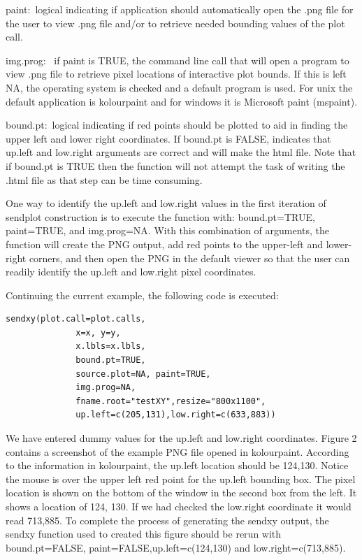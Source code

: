 \documentclass[]{article}
\begin{document}
\begin{description}
 \item{paint:~}{logical indicating if application should
    automatically open the .png file for the user to view .png file and/or
    to retrieve needed bounding values of the plot call.}

  \item{img.prog:~ }{if paint is TRUE, the command line call that will open
    a program to view .png file to retrieve pixel locations of interactive
    plot bounds. If this is left NA, the operating system is checked and
    a default program is used. For unix the default application is
    kolourpaint and for windows it is Microsoft paint (mspaint).}

  \item{bound.pt:~}{logical indicating if red points should be plotted to
    aid in finding the upper left and lower right coordinates. If
    bound.pt is FALSE, indicates that up.left and low.right arguments
    are correct and will make the html file. Note that if bound.pt is TRUE then the function will not
    attempt the task of writing the .html file as that step can be time consuming.}

 \end{description}
One way to identify the up.left and low.right values in the first iteration of sendplot construction is to execute the function with: bound.pt=TRUE, paint=TRUE, and img.prog=NA. With this combination of arguments, the function will create the PNG output, add red points to the upper-left and lower-right corners, and then open the PNG in the default viewer so that the user can readily identify the up.left and low.right pixel coordinates. 

\indent Continuing the current example, the following code is executed:
\begin{verbatim}
sendxy(plot.call=plot.calls, 
              x=x, y=y,
              x.lbls=x.lbls, 
              bound.pt=TRUE, 
              source.plot=NA, paint=TRUE,
              img.prog=NA,
              fname.root="testXY",resize="800x1100",
              up.left=c(205,131),low.right=c(633,883))
\end{verbatim}
We have entered dummy values for the up.left and low.right coordinates. Figure 2 contains a screenshot of the example PNG file opened in kolourpaint. According to the information in kolourpaint, the up.left location should be 124,130. Notice the mouse is over the upper left red point for the up.left bounding box. The pixel location is shown on the bottom of the window in the second box from the left. It shows a location of 124, 130. If we had checked the low.right coordinate it would read 713,885. To complete the process of generating the sendxy output, the sendxy function used to created this figure should be rerun with bound.pt=FALSE, paint=FALSE,up.left=c(124,130) and low.right=c(713,885). \newline
\end{document}
